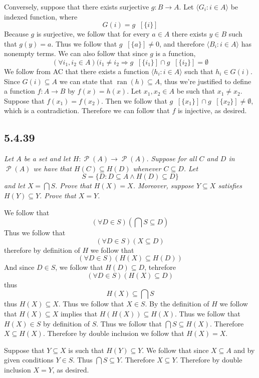\documentclass[11pt,oneside,titlepage]{book}
\DeclareMathOperator \pow {\mathcal {P}}
\DeclareMathOperator \inv {^{-1}}
\DeclareMathOperator \ra {\Rightarrow}
\DeclareMathOperator \ran {ran}
\newcommand{\eangle}[1]{\langle #1 \rangle}
\begin{document}
Conversely,
suppose that there exists surjective  $g: B \to A$. 
Let $\eangle{G_i: i \in A}$ be indexed function, where
$$G(i) = g\inv[\{i\}] $$
Because $g$ is surjective, we follow that for every $a \in A$ there exists
$y \in B$ such that $g(y) = a$. 
Thus we follow that $g\inv[\{a\}] \neq 0$,
and therefore $\eangle{B_i: i \in A}$ has nonempty terms.
We can also follow that since $g$ is a function,
$$(\forall i_1, i_2 \in A)(i_1 \neq i_2 \ra g\inv[\{i_1\}] \cap g\inv[\{i_2\}] = \emptyset$$
We follow from AC
that there exists a function $\eangle{h_i: i \in A}$ such that $h_i \in G(i)$.
Since $G(i) \subseteq A$ we can state that $\ran(h) \subseteq A$, thus we're
justified to define a function $f: A \to B$ by $f(x) = h(x)$.
Let  $x_1, x_2 \in A$ be such that $x_1 \neq x_2$. Suppose that $f(x_1) = f(x_2)$.
Then we follow that $g\inv[\{x_1\}] \cap g\inv[\{x_2\}] \neq \emptyset$, which is a
contradiction. Therefore we can follow that $f$ is injective, as desired.

\subsection*{5.4.39}

\textit{Let $A$ be a set and let $H: \pow(A) \to \pow(A)$. Suppose for all $C$ and $D$
  in $\pow(A)$ we have that $H(C) \subseteq H(D)$ whenever $C \subseteq D$.
  Let
  $$S = \{D: D \subseteq A \land H(D) \subseteq D\}$$
  and let $X = \bigcap{S}$. Prove that $H(X) = X$. Moreover, suppose $Y \subseteq X$
  satisfies $H(Y) \subseteq Y$. Prove that $X = Y$.}

We follow that
$$(\forall D \in S)(\bigcap{S} \subseteq D)$$
Thus we follow that
$$(\forall D \in S)(X \subseteq D)$$
therefore by definition of $H$ we follow that 
$$(\forall D \in S)(H(X) \subseteq H(D))$$
And since $D \in S$, we follow that $H(D) \subseteq D$, tehrefore
$$(\forall D \in S)(H(X) \subseteq D)$$
thus
$$H(X) \subseteq \bigcap{S}$$
thus $H(X) \subseteq X$. Thus we follow that $X \in S$. By the definition of $H$
we follow that $H(X) \subseteq X$ implies that $H(H(X)) \subseteq H(X)$. Thus
we follow that $H(X) \in S$ by definition of $S$. Thus we follow that
$\bigcap{S} \subseteq H(X)$. Therefore $X \subseteq H(X)$. Therefore by double inclusion
we follow that $H(X) = X$.

Suppose that $Y \subseteq X$ is such that $H(Y) \subseteq Y$. We follow that since
$X \subseteq A$ and by given conditions $Y \in S$. Thus $\bigcap{S} \subseteq Y$.
Therefore $X \subseteq Y$. Therefore by double inclusion $X = Y$, as desired.
\end{document}
